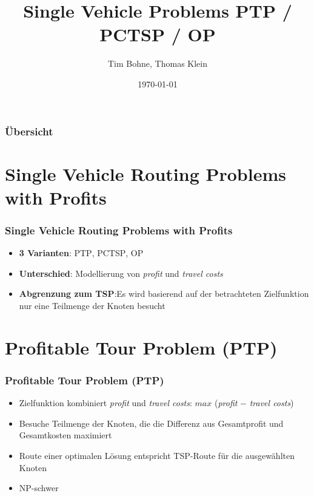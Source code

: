 \documentclass{beamer}
\title[]{Single Vehicle Problems \textsc{PTP} / \textsc{PCTSP} / \textsc{OP}}
\author{Tim Bohne, Thomas Klein}
\institute[]
{
\textit{Master-Projektgruppe - Team Orienteering Problems für individuelle Touristenrouten}
\medskip
}
\date{\today}
\begin{document}
\begin{frame}[plain] %
\titlepage %
\end{frame}

\begin{frame}
\frametitle{Übersicht} %
\tableofcontents
\end{frame}

\section{Single Vehicle Routing Problems with Profits}

\begin{frame}
\frametitle{Single Vehicle Routing Problems with Profits}
\begin{itemize}
  \item \textbf{3 Varianten}: \textsc{PTP}, \textsc{PCTSP}, \textsc{OP}
  \item \textbf{Unterschied}: Modellierung von \textit{profit} und \textit{travel costs}
  \item \textbf{Abgrenzung zum \textsc{TSP}}:\newline Es wird basierend auf der betrachteten
  Zielfunktion nur eine Teilmenge der Knoten besucht
\end{itemize}
\end{frame}

\section{Profitable Tour Problem (\textsc{PTP})}

\begin{frame}
\frametitle{Profitable Tour Problem (\textsc{PTP})}
\begin{itemize}
  \item Zielfunktion kombiniert \textit{profit} und \textit{travel costs}:\newline
  $max$ (\textit{profit} $-$ \textit{travel costs})
  \item Besuche Teilmenge der Knoten, die die Differenz aus Gesamtprofit und Gesamtkosten maximiert
  \item Route einer optimalen Lösung entspricht \textsc{TSP}-Route für die ausgewählten Knoten
  \item NP-schwer
\end{itemize}
\end{frame}
\end{document}

